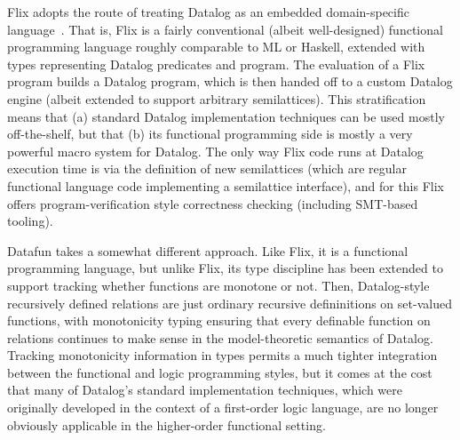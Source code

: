 %
%
%
%
%
%
%
Flix adopts the route of treating Datalog as an embedded
domain-specific language~\cite{edsl}. That is, Flix is a fairly
conventional (albeit well-designed) functional programming language
roughly comparable to ML or Haskell, extended with types representing
Datalog predicates and program. The evaluation of a Flix program
builds a Datalog program, which is then handed off to a custom Datalog
engine (albeit extended to support arbitrary semilattices).  This
stratification means that (a) standard Datalog implementation
techniques can be used mostly off-the-shelf, but that (b) its
functional programming side is mostly a very powerful macro system for
Datalog.  The only way Flix code runs at Datalog execution time is via
the definition of new semilattices (which are regular functional
language code implementing a semilattice interface), and for this Flix
offers program-verification style correctness checking (including
SMT-based tooling).

Datafun takes a somewhat different approach. Like Flix, it is a
functional programming language, but unlike Flix, its type discipline
has been extended to support tracking whether functions are monotone
or not. Then, Datalog-style recursively defined relations are just
ordinary recursive defininitions on set-valued functions, with
monotonicity typing ensuring that every definable function on
relations continues to make sense in the model-theoretic semantics of
Datalog. Tracking monotonicity information in types permits a much
tighter integration between the functional and logic programming
styles, but it comes at the cost that many of Datalog's standard
implementation techniques, which were originally developed in the
context of a first-order logic language, are no longer obviously
applicable in the higher-order functional setting.

